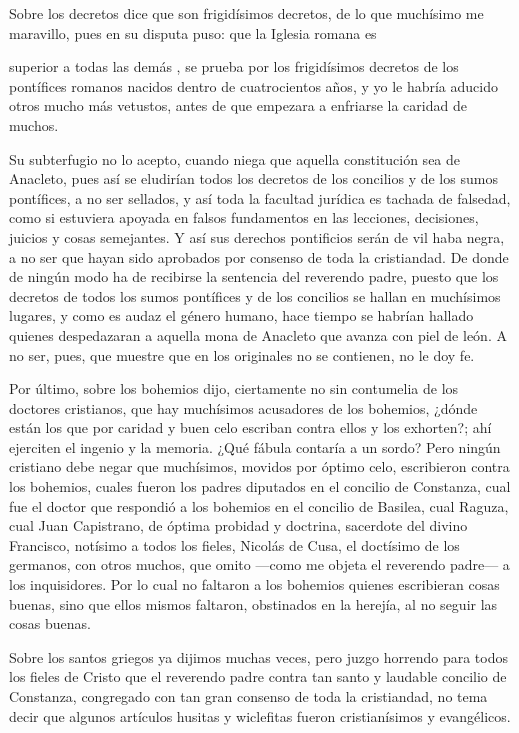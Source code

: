 Sobre los decretos dice que son frigidísimos decretos, de lo que muchísimo me maravillo, pues en su disputa puso: que la Iglesia romana es

superior a todas las demás \marginpar{\small[283]}, se prueba por los frigidísimos decretos de los pontífices romanos nacidos dentro de cuatrocientos años, y yo le habría aducido otros mucho más vetustos, antes de que empezara a enfriarse la caridad de muchos.

Su subterfugio no lo acepto, cuando niega que aquella constitución sea de Anacleto, pues así se eludirían todos los decretos de los concilios y de los sumos pontífices, a no ser sellados, y así toda la facultad jurídica es tachada de falsedad, como si estuviera apoyada en falsos fundamentos en las lecciones, decisiones, juicios y cosas semejantes. Y así sus derechos pontificios serán de vil haba negra, a no ser que hayan sido aprobados por consenso de toda la cristiandad. De donde de ningún modo ha de recibirse la sentencia del reverendo padre, puesto que los decretos de todos los sumos pontífices y de los concilios se hallan en muchísimos lugares, y como es audaz el género humano, hace tiempo se habrían hallado quienes despedazaran a aquella mona de Anacleto que avanza con piel de león. A no ser, pues, que muestre que en los originales no se contienen, no le doy fe.

Por último, sobre los bohemios dijo, ciertamente no sin contumelia de los doctores cristianos, que hay muchísimos acusadores de los bohemios, ¿dónde están los que por caridad y buen celo escriban contra ellos y los exhorten?; ahí ejerciten el ingenio y la memoria. ¿Qué fábula contaría a un sordo? Pero ningún cristiano debe negar que muchísimos, movidos por óptimo celo, escribieron contra los bohemios, cuales fueron los padres diputados en el concilio de Constanza, cual fue el doctor que respondió a los bohemios en el concilio de Basilea, cual Raguza, cual Juan Capistrano, de óptima probidad y doctrina, sacerdote del divino Francisco, notísimo a todos los fieles, Nicolás de Cusa, el doctísimo de los germanos, con otros muchos, que omito —como me objeta el reverendo padre— a los inquisidores. Por lo cual no faltaron a los bohemios quienes escribieran cosas buenas, sino que ellos mismos faltaron, obstinados en la herejía, al no seguir las cosas buenas.

Sobre los santos griegos ya dijimos muchas veces, pero juzgo horrendo para todos los fieles de Cristo que el reverendo padre contra tan santo y laudable concilio de Constanza, congregado con tan gran consenso de toda la cristiandad, no tema decir que algunos artículos husitas y wiclefitas fueron cristianísimos y evangélicos.

